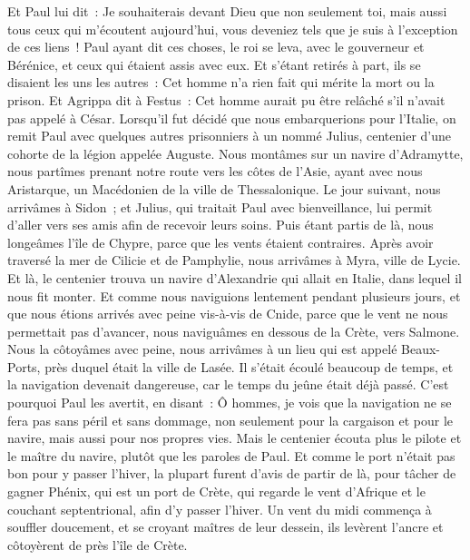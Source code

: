 \begin{multicols}{2}
Et Paul lui dit~: Je souhaiterais devant Dieu que non seulement toi, mais aussi tous ceux qui m'écoutent aujourd'hui, vous deveniez tels que je suis à l'exception de ces liens~!
Paul ayant dit ces choses, le roi se leva, avec le gouverneur et Bérénice, et ceux qui étaient assis avec eux.
Et s'étant retirés à part, ils se disaient les uns les autres~: Cet homme n'a rien fait qui mérite la mort ou la prison.
Et Agrippa dit à Festus~: Cet homme aurait pu être relâché s'il n'avait pas appelé à César.
\VerseOne{}Lorsqu'il fut décidé que nous embarquerions pour l'Italie, on remit Paul avec quelques autres prisonniers à un nommé Julius, centenier d'une cohorte de la légion appelée Auguste.
Nous montâmes sur un navire d'Adramytte, nous partîmes prenant notre route vers les côtes de l'Asie, ayant avec nous Aristarque, un Macédonien de la ville de Thessalonique.
Le jour suivant, nous arrivâmes à Sidon~; et Julius, qui traitait Paul avec bienveillance, lui permit d'aller vers ses amis afin de recevoir leurs soins.
Puis étant partis de là, nous longeâmes l'île de Chypre, parce que les vents étaient contraires.
Après avoir traversé la mer de Cilicie et de Pamphylie, nous arrivâmes à Myra, ville de Lycie.
Et là, le centenier trouva un navire d'Alexandrie qui allait en Italie, dans lequel il nous fit monter.
Et comme nous naviguions lentement pendant plusieurs jours, et que nous étions arrivés avec peine vis-à-vis de Cnide, parce que le vent ne nous permettait pas d'avancer, nous naviguâmes en dessous de la Crète, vers Salmone.
Nous la côtoyâmes avec peine, nous arrivâmes à un lieu qui est appelé Beaux-Ports, près duquel était la ville de Lasée.
Il s'était écoulé beaucoup de temps, et la navigation devenait dangereuse, car le temps du jeûne était déjà passé.
C'est pourquoi Paul les avertit, en disant~: Ô hommes, je vois que la navigation ne se fera pas sans péril et sans dommage, non seulement pour la cargaison et pour le navire, mais aussi pour nos propres vies.
Mais le centenier écouta plus le pilote et le maître du navire, plutôt que les paroles de Paul.
Et comme le port n'était pas bon pour y passer l'hiver, la plupart furent d'avis de partir de là, pour tâcher de gagner Phénix, qui est un port de Crète, qui regarde le vent d'Afrique et le couchant septentrional, afin d'y passer l'hiver.
Un vent du midi commença à souffler doucement, et se croyant maîtres de leur dessein, ils levèrent l'ancre et côtoyèrent de près l'île de Crète.

\end{multicols}

